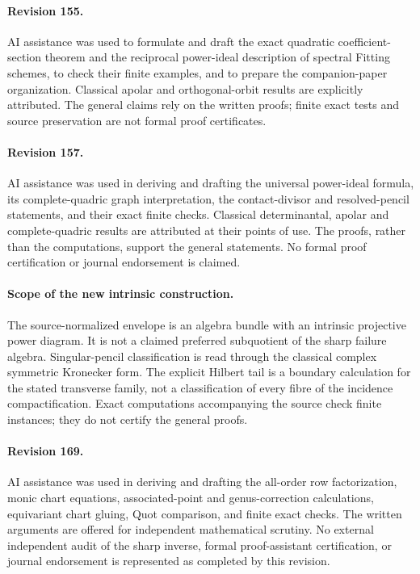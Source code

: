 \documentclass[11pt,reqno]{amsart}
\numberwithin{equation}{section}
\theoremstyle{definition}\newtheorem{definition}[theorem]{Definition}
\theoremstyle{remark}\newtheorem{remark}[theorem]{Remark}
\begin{document}
\paragraph{Revision 155.}
AI assistance was used to formulate and draft the exact quadratic
coefficient-section theorem and the reciprocal power-ideal description
of spectral Fitting schemes, to check their finite examples, and to
prepare the companion-paper organization.  Classical apolar and
orthogonal-orbit results are explicitly attributed.  The general
claims rely on the written proofs; finite exact tests and source
preservation are not formal proof certificates.

\paragraph{Revision 157.}
AI assistance was used in deriving and drafting the universal power-ideal
formula, its complete-quadric graph interpretation, the contact-divisor
and resolved-pencil statements, and their exact finite checks. Classical
determinantal, apolar and complete-quadric results are attributed at their
points of use. The proofs, rather than the computations, support the
general statements. No formal proof certification or journal endorsement
is claimed.

\paragraph{Scope of the new intrinsic construction.}
The source-normalized envelope is an algebra bundle with an intrinsic
projective power diagram. It is not a claimed preferred subquotient
of the sharp failure algebra. Singular-pencil classification is read
through the classical complex symmetric Kronecker form. The explicit
Hilbert tail is a boundary calculation for the stated transverse
family, not a classification of every fibre of the incidence
compactification. Exact computations accompanying the source check
finite instances; they do not certify the general proofs.

\paragraph{Revision 169.}
AI assistance was used in deriving and drafting the all-order row
factorization, monic chart equations, associated-point and genus-correction
calculations, equivariant chart gluing, Quot comparison, and finite exact
checks. The written arguments are offered for independent mathematical
scrutiny. No external independent audit of the sharp inverse, formal
proof-assistant certification, or journal endorsement is represented as
completed by this revision.
\end{document}
